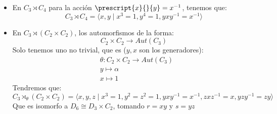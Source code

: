 \begin{itemize}
    \item En $C_3\rtimes C_4$ para la acción $\prescript{x}{}{y} = x^{-1}$, tenemos que:
        \begin{equation*}
            C_3 \rtimes C_4 = \langle x,y\mid x^3=1, y^4 = 1, yxy^{-1}=x^{-1} \rangle 
        \end{equation*}
    \item En $C_3\rtimes (C_2\times C_2)$, los automorfismos de la forma:
        \begin{equation*}
            C_2\times C_2\to Aut(C_3)
        \end{equation*}
        Solo tenemos uno no trivial, que es ($y,x$ son los generadores):
        \begin{align*}
            &\theta:C_2\times C_2 \to Aut(C_3) \\
            &y\longmapsto \alpha \\
            &x\longmapsto 1
        \end{align*}
        Tendremos que:
        \begin{equation*}
            C_3\rtimes_\theta(C_2\times C_2) = \langle x,y,z \mid x^3=1, y^2 = z^2 = 1, yxy^{-1}=x^{-1},zxz^{-1}=x, yzy^{-1}=zy \rangle 
        \end{equation*}
        Que es isomorfo a $D_6\cong D_3\times C_2$, tomando $r =xy$ y $s = yz$ %
\end{itemize}

